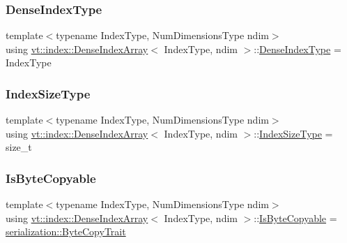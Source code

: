 \subsubsection{\texorpdfstring{Dense\+Index\+Type}{DenseIndexType}}
{\footnotesize\ttfamily template$<$typename Index\+Type, Num\+Dimensions\+Type ndim$>$ \\
using \hyperlink{structvt_1_1index_1_1_dense_index_array}{vt\+::index\+::\+Dense\+Index\+Array}$<$ Index\+Type, ndim $>$\+::\hyperlink{structvt_1_1index_1_1_dense_index_array_a36698427e28045290d1fb072573275ec}{Dense\+Index\+Type} =  Index\+Type}

\mbox{\label{structvt_1_1index_1_1_dense_index_array_ae2999552165f16fc69a2940e0589819f}} 
\subsubsection{\texorpdfstring{Index\+Size\+Type}{IndexSizeType}}
{\footnotesize\ttfamily template$<$typename Index\+Type, Num\+Dimensions\+Type ndim$>$ \\
using \hyperlink{structvt_1_1index_1_1_dense_index_array}{vt\+::index\+::\+Dense\+Index\+Array}$<$ Index\+Type, ndim $>$\+::\hyperlink{structvt_1_1index_1_1_dense_index_array_ae2999552165f16fc69a2940e0589819f}{Index\+Size\+Type} =  size\+\_\+t}

\mbox{\label{structvt_1_1index_1_1_dense_index_array_a0d13f3168c5d8b4b3abc6cb083d34bc3}} 
\subsubsection{\texorpdfstring{Is\+Byte\+Copyable}{IsByteCopyable}}
{\footnotesize\ttfamily template$<$typename Index\+Type, Num\+Dimensions\+Type ndim$>$ \\
using \hyperlink{structvt_1_1index_1_1_dense_index_array}{vt\+::index\+::\+Dense\+Index\+Array}$<$ Index\+Type, ndim $>$\+::\hyperlink{structvt_1_1index_1_1_dense_index_array_a0d13f3168c5d8b4b3abc6cb083d34bc3}{Is\+Byte\+Copyable} =  \hyperlink{structvt_1_1serialization_1_1_byte_copy_trait}{serialization\+::\+Byte\+Copy\+Trait}}

